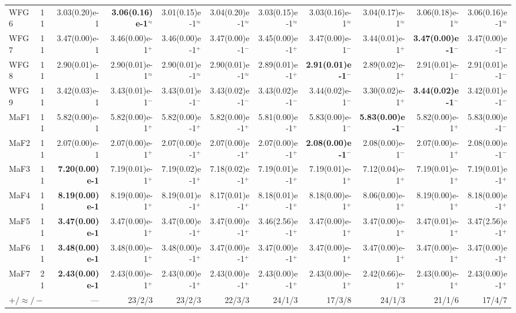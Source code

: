 \begin{longtable}{llrrrrrrrrr}
WFG6 & 11 & 3.03(0.20)e-1 & \textbf{3.06(0.16)e-1}$^{\approx}$ & 3.01(0.15)e-1$^{\approx}$ & 3.04(0.20)e-1$^{\approx}$ & 3.03(0.15)e-1$^{\approx}$ & 3.03(0.16)e-1$^{\approx}$ & 3.04(0.17)e-1$^{\approx}$ & 3.06(0.18)e-1$^{\approx}$ & 3.06(0.16)e-1$^{\approx}$ \\
WFG7 & 11 & 3.47(0.00)e-1 & 3.46(0.00)e-1$^{+}$ & 3.46(0.00)e-1$^{+}$ & 3.47(0.00)e-1$^{-}$ & 3.45(0.00)e-1$^{+}$ & 3.47(0.00)e-1$^{-}$ & 3.44(0.01)e-1$^{+}$ & \textbf{3.47(0.00)e-1}$^{-}$ & 3.47(0.00)e-1$^{-}$ \\
WFG8 & 11 & 2.90(0.01)e-1 & 2.90(0.01)e-1$^{\approx}$ & 2.90(0.01)e-1$^{\approx}$ & 2.90(0.01)e-1$^{\approx}$ & 2.89(0.01)e-1$^{+}$ & \textbf{2.91(0.01)e-1}$^{-}$ & 2.89(0.02)e-1$^{+}$ & 2.91(0.01)e-1$^{-}$ & 2.91(0.01)e-1$^{-}$ \\
WFG9 & 11 & 3.42(0.03)e-1 & 3.43(0.01)e-1$^{-}$ & 3.43(0.01)e-1$^{-}$ & 3.43(0.02)e-1$^{-}$ & 3.43(0.02)e-1$^{-}$ & 3.44(0.02)e-1$^{-}$ & 3.30(0.02)e-1$^{+}$ & \textbf{3.44(0.02)e-1}$^{-}$ & 3.42(0.01)e-1$^{-}$ \\
\midrule
MaF1 & 11 & 5.82(0.00)e-1 & 5.82(0.00)e-1$^{+}$ & 5.82(0.00)e-1$^{+}$ & 5.82(0.00)e-1$^{+}$ & 5.81(0.00)e-1$^{+}$ & 5.83(0.00)e-1$^{-}$ & \textbf{5.83(0.00)e-1}$^{-}$ & 5.82(0.00)e-1$^{+}$ & 5.83(0.00)e-1$^{-}$ \\
MaF2 & 11 & 2.07(0.00)e-1 & 2.07(0.00)e-1$^{+}$ & 2.07(0.00)e-1$^{+}$ & 2.07(0.00)e-1$^{+}$ & 2.07(0.00)e-1$^{+}$ & \textbf{2.08(0.00)e-1}$^{-}$ & 2.08(0.00)e-1$^{-}$ & 2.07(0.00)e-1$^{+}$ & 2.08(0.00)e-1$^{-}$ \\
MaF3 & 11 & \textbf{7.20(0.00)e-1} & 7.19(0.01)e-1$^{+}$ & 7.19(0.02)e-1$^{+}$ & 7.18(0.02)e-1$^{+}$ & 7.19(0.01)e-1$^{+}$ & 7.19(0.01)e-1$^{+}$ & 7.12(0.04)e-1$^{+}$ & 7.19(0.01)e-1$^{+}$ & 7.19(0.01)e-1$^{+}$ \\
MaF4 & 11 & \textbf{8.19(0.00)e-1} & 8.19(0.00)e-1$^{+}$ & 8.19(0.01)e-1$^{+}$ & 8.17(0.01)e-1$^{+}$ & 8.18(0.01)e-1$^{+}$ & 8.18(0.00)e-1$^{+}$ & 8.06(0.00)e-1$^{+}$ & 8.19(0.00)e-1$^{+}$ & 8.18(0.00)e-1$^{+}$ \\
MaF5 & 11 & \textbf{3.47(0.00)e-1} & 3.47(0.00)e-1$^{+}$ & 3.47(0.00)e-1$^{+}$ & 3.47(0.00)e-1$^{+}$ & 3.46(2.56)e-1$^{+}$ & 3.47(0.00)e-1$^{+}$ & 3.47(0.00)e-1$^{+}$ & 3.47(0.01)e-1$^{+}$ & 3.47(2.56)e-1$^{+}$ \\
MaF6 & 11 & \textbf{3.48(0.00)e-1} & 3.48(0.00)e-1$^{+}$ & 3.48(0.00)e-1$^{+}$ & 3.47(0.00)e-1$^{+}$ & 3.47(0.00)e-1$^{+}$ & 3.47(0.00)e-1$^{+}$ & 3.47(0.00)e-1$^{+}$ & 3.47(0.00)e-1$^{+}$ & 3.47(0.00)e-1$^{+}$ \\
MaF7 & 21 & \textbf{2.43(0.00)e-1} & 2.43(0.00)e-1$^{+}$ & 2.43(0.00)e-1$^{+}$ & 2.43(0.00)e-1$^{+}$ & 2.43(0.00)e-1$^{+}$ & 2.43(0.00)e-1$^{+}$ & 2.42(0.66)e-1$^{+}$ & 2.43(0.00)e-1$^{+}$ & 2.43(0.00)e-1$^{+}$ \\
\midrule
\multicolumn{2}{l}{$+/\approx/-$} & --- & 23/2/3 & 23/2/3 & 22/3/3 & 24/1/3 & 17/3/8 & 24/1/3 & 21/1/6 & 17/4/7 \\
\end{longtable}